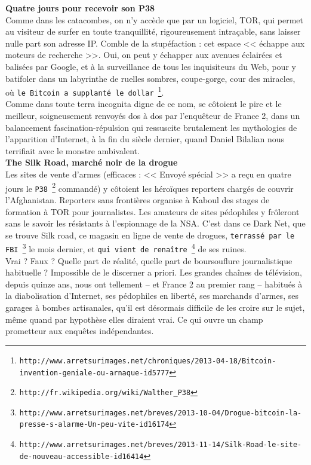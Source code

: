 \documentclass[11pt,twoside,a4paper]{article}
\begin{document}
\textbf{Quatre jours pour recevoir son P38} ~\\

Comme dans les catacombes, on n'y acc{\`e}de que par un logiciel, TOR, qui permet au visiteur de surfer en toute tranquillit{\'e}, rigoureusement intra\c{c}able, sans laisser nulle part son adresse IP. Comble de la stup{\'e}faction : cet espace << {\'e}chappe aux moteurs de recherche >>. Oui, on peut y {\'e}chapper aux avenues {\'e}clair{\'e}es et balis{\'e}es par Google, et {\`a} la surveillance de tous les inquisiteurs du Web, pour y batifoler dans un labyrinthe de ruelles sombres, coupe-gorge, cour des miracles, o{\`u} \texttt{le Bitcoin a supplant{\'e} le dollar~\footnote{\texttt{http://www.arretsurimages.net/chroniques/2013-04-18/Bitcoin-invention-geniale-ou-arnaque-id5777}}}. ~\\

Comme dans toute terra incognita digne de ce nom, se c{\^o}toient le pire et le meilleur, soigneusement renvoy{\'e}s dos {\`a} dos par l'enqu{\^e}teur de France 2, dans un balancement fascination-r{\'e}pulsion qui ressuscite brutalement les mythologies de l'apparition d'Internet, {\`a} la fin du si{\`e}cle dernier, quand Daniel Bilalian nous terrifiait avec le monstre ambivalent. ~\\

\textbf{The Silk Road, march{\'e} noir de la drogue} ~\\

Les sites de vente d'armes (efficaces : << Envoy{\'e} sp{\'e}cial >> a re\c{c}u en quatre jours le \texttt{P38~\footnote{\texttt{http://fr.wikipedia.org/wiki/Walther\_P38}}} command{\'e}) y c{\^o}toient les h{\'e}ro{\"i}ques reporters charg{\'e}s de couvrir l'Afghanistan. Reporters sans fronti{\`e}res organise {\`a} Kaboul des stages de formation {\`a} TOR pour journalistes. Les amateurs de sites p{\'e}dophiles y fr{\^o}leront sans le savoir les r{\'e}sistants {\`a} l'espionnage de la NSA. C'est dans ce Dark Net, que se trouve Silk road, ce magasin en ligne de vente de drogues, \texttt{terrass{\'e} par le FBI~\footnote{\texttt{http://www.arretsurimages.net/breves/2013-10-04/Drogue-bitcoin-la-presse-s-alarme-Un-peu-vite-id16174}}} le mois dernier, et \texttt{qui vient de rena{\^i}tre~\footnote{\texttt{http://www.arretsurimages.net/breves/2013-11-14/Silk-Road-le-site-de-nouveau-accessible-id16414}}} de ses ruines. ~\\

Vrai ? Faux ? Quelle part de r{\'e}alit{\'e}, quelle part de boursouflure journalistique habituelle ? Impossible de le discerner a priori. Les grandes cha{\^i}nes de t{\'e}l{\'e}vision, depuis quinze ans, nous ont tellement -- et France 2 au premier rang -- habitu{\'e}s {\`a} la diabolisation d'Internet, ses p{\'e}dophiles en libert{\'e}, ses marchands d'armes, ses garages {\`a} bombes artisanales, qu'il est d{\'e}sormais difficile de les croire sur le sujet, m{\^e}me quand par hypoth{\`e}se elles diraient vrai. Ce qui ouvre un champ prometteur aux enqu{\^e}tes ind{\'e}pendantes. ~\\
\end{document}

